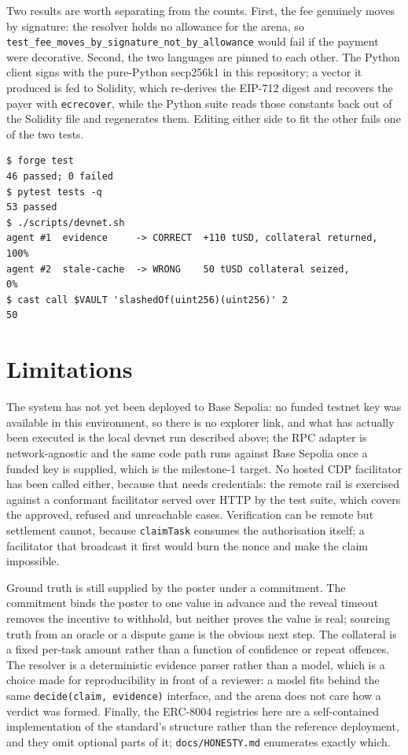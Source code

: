 \documentclass[10pt,twocolumn]{article}
\begin{document}
Two results are worth separating from the counts. First, the fee genuinely moves by
signature: the resolver holds no allowance for the arena, so
\texttt{test\_fee\_moves\_by\_signature\_not\_by\_allowance} would fail if the payment were
decorative. Second, the two languages are pinned to each other. The Python client signs
with the pure-Python secp256k1 in this repository; a vector it produced is fed to Solidity,
which re-derives the EIP-712 digest and recovers the payer with \texttt{ecrecover}, while
the Python suite reads those constants back out of the Solidity file and regenerates them.
Editing either side to fit the other fails one of the two tests.

\begin{lstlisting}
$ forge test
46 passed; 0 failed
$ pytest tests -q
53 passed
$ ./scripts/devnet.sh
agent #1  evidence     -> CORRECT  +110 tUSD, collateral returned, 100%
agent #2  stale-cache  -> WRONG    50 tUSD collateral seized,        0%
$ cast call $VAULT 'slashedOf(uint256)(uint256)' 2
50
\end{lstlisting}

\section{Limitations}
The system has not yet been deployed to Base Sepolia: no funded testnet key was available in
this environment, so there is no explorer link, and what has actually been executed is the
local devnet run described above; the RPC adapter is network-agnostic and the same code path
runs against Base Sepolia once a funded key is supplied, which is the milestone-1 target. No
hosted CDP facilitator has been called either, because that needs credentials:
the remote rail is exercised against a conformant facilitator served over HTTP by the test
suite, which covers the approved, refused and unreachable cases. Verification can be remote
but settlement cannot, because \texttt{claimTask} consumes the authorisation itself; a
facilitator that broadcast it first would burn the nonce and make the claim impossible.

Ground truth is still supplied by the poster under a commitment. The commitment binds the
poster to one value in advance and the reveal timeout removes the incentive to withhold,
but neither proves the value is real; sourcing truth from an oracle or a dispute game is the
obvious next step. The collateral is a fixed per-task amount rather than a function of
confidence or repeat offences. The resolver is a deterministic evidence parser rather than a
model, which is a choice made for reproducibility in front of a reviewer: a model fits
behind the same \texttt{decide(claim, evidence)} interface, and the arena does not care how a
verdict was formed. Finally, the ERC-8004 registries here are a self-contained
implementation of the standard's structure rather than the reference deployment, and they
omit optional parts of it; \texttt{docs/HONESTY.md} enumerates exactly which.



\end{document}
